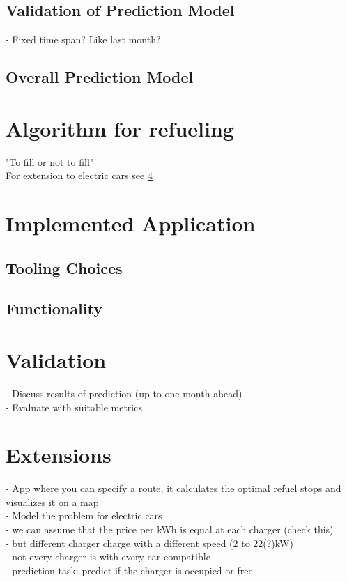 \documentclass[%
a4paper,
DIV12,
2.5headlines,
bigheadings,
titlepage,
openbib,
]{scrartcl}
\begin{document}
\subsection{Validation of Prediction
Model}\label{validation-of-prediction-model}
- Fixed time span? Like last month?


\subsection{Overall Prediction Model}\label{overall-prediction-model}

\section{Algorithm for refueling}
"To fill or not to fill"\cite{khuller2007fill}\\
For extension to electric cars see \ref{extensions}

\section{Implemented Application}\label{implemented-application}
\subsection{Tooling Choices}\label{tooling-choices}



\subsection{Functionality}\label{functionality}



\section{Validation}\label{validation}
- Discuss results of prediction (up to one month ahead)\\
- Evaluate with suitable metrics


\section{Extensions}\label{extensions}
- App where you can specify a route, it calculates the optimal refuel stops and visualizes it on a map\\ 
- Model the problem for electric cars\\
 - we can assume that the price per kWh is equal at each charger (check this)\\
 - but different charger charge with a different speed (2 to 22(?)kW)\\
 - not every charger is with every car compatible\\
 - prediction task: predict if the charger is occupied or free\\


 
\end{document}
